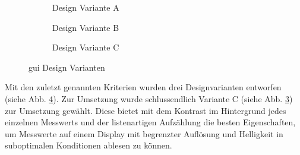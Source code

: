 \begin{figure}[H]
    	\begin{subfigure}[t]{0.5\textwidth}
    		\centering
    		\caption{Design Variante A \label{fig:variante_a}}
    	\end{subfigure}
        \hfill
    	\begin{subfigure}[t]{0.5\textwidth}
    		\centering
    		\caption{Design Variante B \label{fig:variante_b}}
    	\end{subfigure}
    \begin{subfigure}[t]{\textwidth}
		\centering
		\caption{Design Variante C \label{fig:variante_c}}
	\end{subfigure}
	\caption{\acs{gui} Design Varianten \label{fig:design_varianten}}
\end{figure}

Mit den zuletzt genannten Kriterien wurden drei Designvarianten entworfen (siehe Abb. \ref{fig:design_varianten}). Zur Umsetzung wurde schlussendlich Variante C (siehe Abb. \ref{fig:variante_c}) zur Umsetzung gewählt. Diese bietet mit dem Kontrast im Hintergrund jedes einzelnen Messwerts und der listenartigen Aufzählung die besten Eigenschaften, um Messwerte auf einem Display mit begrenzter Auflösung und Helligkeit in suboptimalen Konditionen ablesen zu können. 

